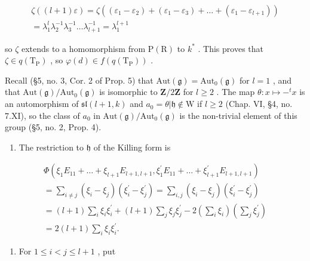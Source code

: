 \[
\begin{array}{c} \zeta ((l + 1) \varepsilon) = \zeta ((\varepsilon_ {1} - \varepsilon_ {2}) + (\varepsilon_ {1} - \varepsilon_ {3}) + \dots + (\varepsilon_ {1} - \varepsilon_ {l + 1})) \\ = \lambda_ {1} ^ {l} \lambda_ {2} ^ {- 1} \lambda_ {3} ^ {- 1} \ldots \lambda_ {l + 1} ^ {- 1} = \lambda_ {1} ^ {l + 1} \end{array}
\]

so \(\zeta\) extends to a homomorphism from \(\mathrm{P}(\mathrm{R})\) to \(k^{*}\) . This proves that \(\zeta \in q(\mathrm{T}_{\mathrm{P}})\) , so \(\varphi(d) \in f(q(\mathrm{T}_{\mathrm{P}}))\) .

Recall (§5, no. 3, Cor. 2 of Prop. 5) that \(\mathrm{Aut}(\mathfrak{g}) = \mathrm{Aut}_0(\mathfrak{g})\) for \(l = 1\) , and that \(\mathrm{Aut}(\mathfrak{g}) / \mathrm{Aut}_0(\mathfrak{g})\) is isomorphic to \(\mathbf{Z}/2\mathbf{Z}\) for \(l \geq 2\) . The map \(\theta : x \mapsto -^t x\) is an automorphism of \(\mathfrak{sl}(l + 1, k)\) and \(a_0 = \theta|\mathfrak{h} \notin \mathrm{W}\) if \(l \geq 2\) (Chap. VI, §4, no. 7.XI), so the class of \(a_0\) in \(\mathrm{Aut}(\mathfrak{g}) / \mathrm{Aut}_0(\mathfrak{g})\) is the non-trivial element of this group (§5, no. 2, Prop. 4).

\begin{enumerate}
\def\labelenumi{(\Roman{enumi})}
\setcounter{enumi}{7}
\tightlist
\item
  The restriction to \(\mathfrak{h}\) of the Killing form is
\end{enumerate}

\[
\begin{array}{l} \Phi (\xi_ {1} E _ {1 1} + \dots + \xi_ {l + 1} E _ {l + 1, l + 1}, \xi_ {1} ^ {\prime} E _ {1 1} + \dots + \xi_ {l + 1} ^ {\prime} E _ {l + 1, l + 1}) \\ = \sum_ {i \neq j} (\xi_ {i} - \xi_ {j}) (\xi_ {i} ^ {\prime} - \xi_ {j} ^ {\prime}) = \sum_ {i, j} (\xi_ {i} - \xi_ {j}) (\xi_ {i} ^ {\prime} - \xi_ {j} ^ {\prime}) \\ = (l + 1) \sum_ {i} \xi_ {i} \xi_ {i} ^ {\prime} + (l + 1) \sum_ {j} \xi_ {j} \xi_ {j} ^ {\prime} - 2 \left(\sum_ {i} \xi_ {i}\right) \left(\sum_ {j} \xi_ {j} ^ {\prime}\right) \\ = 2 (l + 1) \sum_ {i} \xi_ {i} \xi_ {i} ^ {\prime}. \end{array}
\]

\begin{enumerate}
\def\labelenumi{(\Roman{enumi})}
\setcounter{enumi}{8}
\tightlist
\item
  For \(1 \leq i < j \leq l + 1\) , put
\end{enumerate}

